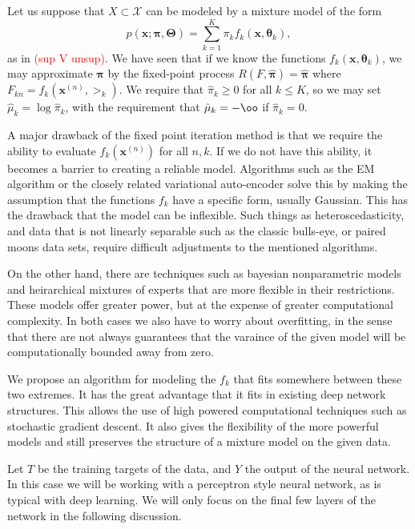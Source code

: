 Let us suppose that $X\subset\mathcal{X}$ can be modeled by a mixture model of the form
\[p(\bm x;\bm\pi,\bm\Theta)=\sum_{k=1}^{K}\pi_kf_k(\bm x,\bm\theta_k),\] as in 
\textcolor{red}{(sup  V unsup)}.  We have seen that if we know the functions  
$f_k(\bm x,\bm\theta_k)$, we may approximate $\bm\pi$ by the fixed-point process
$R(F,\hat{\bm\pi})=\hat{\bm\pi}$ where $F_{kn}=f_k(\bm x^{(n)},\bm\gt_k)$.
We require that $\hat{\pi}_k\geq 0$ for all $k\leq K$, so we may set $\hat{\mu}_k = 
\log\hat{\pi}_k$, with the requirement that $\hat{\mu}_k=-\oo$ if $\hat{\pi}_k=0$.

A major drawback of the fixed point iteration method is that we require the ability 
to evaluate $f_k(\bm x^(n))$ for all $n,k$.  If we do not have this ability, it becomes a
barrier to creating a reliable model.  Algorithms such as the EM algorithm or the closely
related variational auto-encoder solve this by making the assumption that the functions 
$f_k$ have a specific form, usually Gaussian. This has the drawback that the model can
be inflexible. Such things as heteroscedasticity, and data that is not linearly separable
such as the classic bulls-eye, or paired moons data sets, require difficult adjustments
to the mentioned algorithms.

On the other hand, there are techniques such as bayesian nonparametric models and
heirarchical mixtures of experts that are more flexible in their restrictions.  These
models offer greater power, but at the expense of greater computational complexity.  In
both cases we also have to worry about overfitting, in the sense that there are not 
always guarantees that the varaince of the given model will be computationally bounded
away from zero.

We propose an algorithm for modeling the $f_k$ that fits somewhere between these two
extremes. It has the great advantage that it fits in existing deep network structures. 
This allows the use of high powered computational techniques such as stochastic gradient
descent. It also gives the flexibility of the more powerful models and still preserves
the structure of a mixture model on the given data.

Let $T$ be the training targets of the data, and $Y$ the output of the neural network.  
In this case we will be working with a perceptron style neural network, as is typical 
with deep learning.  We will only focus on the final few layers of the network in the
following discussion.

